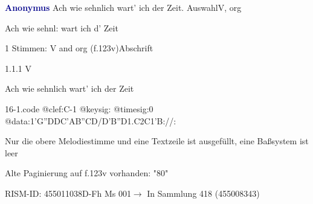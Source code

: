 \documentclass[twocolumn, 12pt]{book}
\begin{document}
\par \vspace{16pt} \textcolor{darkblue}{\textbf{Anonymus  }}\hfillplus{\textbf{[16]}}\newline Ach wie sehnlich wart' ich der Zeit. Auswahl\newline V, org
\par \begin{itshape}[f.123v, heading:] Ach wie sehnl: wart ich d' Zeit\end{itshape} 
\par \textcolor{darkblue}{}  1 Stimmen: V and org  (f.123v)\newline Abschrift
\par 1.1.1  V\newline \begin{footnotesize} Ach wie sehnlich wart' ich der Zeit \end{footnotesize}  
\begin{filecontents*}{16-1.code}
@clef:C-1
@keysig:
@timesig:0
@data:1'G''DDC'AB''CD/D'B''D1.C2C1'B://:
\end{filecontents*}
\newline %
\par Nur die obere Melodiestimme und eine Textzeile ist ausgefüllt, eine Baßsystem ist leer
\par Alte Paginierung auf f.123v vorhanden: "80"
\par RISM-ID: 455011038\newline D-Fh  Ms 001\newline $\rightarrow$ In Sammlung 418 (455008343)
      
\end{document}
